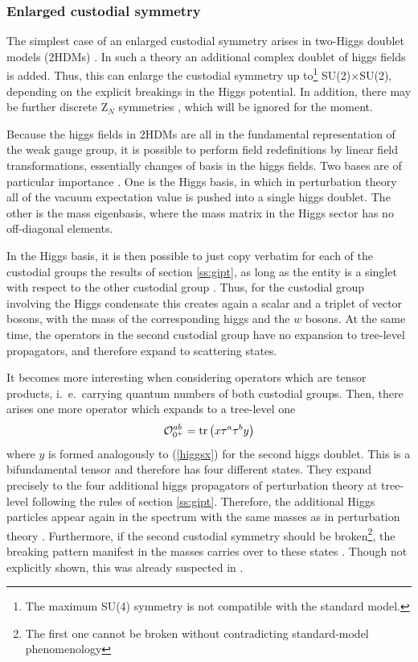 \documentclass[final,12pt,3p,longtitle]{elsarticle}
\newcommand*{\no}{\noindent}
\newcommand*{\be}{\begin{equation}}
\newcommand*{\ee}{\end{equation}}
\newcommand*{\pref}[1]{(\ref{#1})}
\newcommand*{\tr}{\mathrm{tr}}
\newcommand*{\1}{1\!\!\!\bot}
\newcommand*{\op}{{\cal O}}
\begin{document}
\subsubsection{Enlarged custodial symmetry}\label{sss:nhdm}

The simplest case of an enlarged custodial symmetry arises in two-Higgs doublet models (2HDMs) \cite{Morrissey:2009tf,Branco:2011iw,Ivanov:2017dad}. In such a theory an additional complex doublet of higgs fields is added. Thus, this can enlarge the custodial symmetry up to\footnote{The maximum SU(4) symmetry is not compatible with the standard model.} SU(2)$\times$SU(2), depending on the explicit breakings in the Higgs potential. In addition, there may be further discrete Z$_N$ symmetries \cite{Branco:2011iw}, which will be ignored for the moment.

Because the higgs fields in 2HDMs are all in the fundamental representation of the weak gauge group, it is possible to perform field redefinitions by linear field transformations, essentially changes of basis in the higgs fields. Two bases are of particular importance \cite{Branco:2011iw,Ivanov:2017dad}. One is the Higgs basis, in which in perturbation theory all of the vacuum expectation value is pushed into a single higgs doublet. The other is the mass eigenbasis, where the mass matrix in the Higgs sector has no off-diagonal elements.

In the Higgs basis, it is then possible to just copy verbatim for each of the custodial groups the results of section \ref{ss:gipt}, as long as the entity is a singlet with respect to the other custodial group \cite{Maas:2016qpu}. Thus, for the custodial group involving the Higgs condensate this creates again a scalar and a triplet of vector bosons, with the mass of the corresponding higgs and the $w$ bosons. At the same time, the operators in the second custodial group have no expansion to tree-level propagators, and therefore expand to scattering states.

It becomes more interesting when considering operators which are tensor products, i.\ e.\ carrying quantum numbers of both custodial groups. Then, there arises one more operator which expands to a tree-level one \cite{Maas:2016qpu}
\be
\op_{0^+}^{ab}=\tr\left(x\tau^a\tau^by\right)\label{hdmtensor}
\ee
\no where $y$ is formed analogously to \pref{higgsx} for the second higgs doublet. This is a bifundamental tensor and therefore has four different states. They expand precisely to the four additional higgs propagators of perturbation theory at tree-level following the rules of section \ref{ss:gipt}. Therefore, the additional Higgs particles appear again in the spectrum with the same masses \cite{Maas:2016qpu} as in perturbation theory \cite{Branco:2011iw,Ivanov:2017dad}. Furthermore, if the second custodial symmetry should be broken\footnote{The first one cannot be broken without contradicting standard-model phenomenology}, the breaking pattern manifest in the masses carries over to these states \cite{Maas:2016qpu}. Though not explicitly shown, this was already suspected in \cite{Frohlich:1981yi}.
\end{document}

